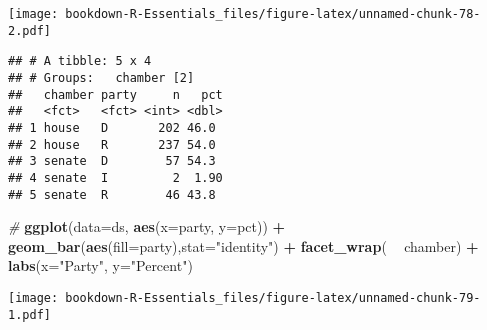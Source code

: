 \documentclass[]{book}
\newenvironment{Shaded}{\begin{snugshade}}{\end{snugshade}}
\newcommand{\KeywordTok}[1]{\textcolor[rgb]{0.13,0.29,0.53}{\textbf{#1}}}
\newcommand{\DataTypeTok}[1]{\textcolor[rgb]{0.13,0.29,0.53}{#1}}
\newcommand{\DecValTok}[1]{\textcolor[rgb]{0.00,0.00,0.81}{#1}}
\newcommand{\StringTok}[1]{\textcolor[rgb]{0.31,0.60,0.02}{#1}}
\newcommand{\CommentTok}[1]{\textcolor[rgb]{0.56,0.35,0.01}{\textit{#1}}}
\newcommand{\OperatorTok}[1]{\textcolor[rgb]{0.81,0.36,0.00}{\textbf{#1}}}
\newcommand{\NormalTok}[1]{#1}
\begin{document}
\texttt{[image: bookdown-R-Essentials\_files/figure-latex/unnamed-chunk-78-2.pdf]}

\begin{Shaded}
\end{Shaded}

\begin{verbatim}
## # A tibble: 5 x 4
## # Groups:   chamber [2]
##   chamber party     n   pct
##   <fct>   <fct> <int> <dbl>
## 1 house   D       202 46.0 
## 2 house   R       237 54.0 
## 3 senate  D        57 54.3 
## 4 senate  I         2  1.90
## 5 senate  R        46 43.8
\end{verbatim}

\begin{Shaded}
\begin{Highlighting}[]
\CommentTok{#}
\KeywordTok{ggplot}\NormalTok{(}\DataTypeTok{data=}\NormalTok{ds, }\KeywordTok{aes}\NormalTok{(}\DataTypeTok{x=}\NormalTok{party, }\DataTypeTok{y=}\NormalTok{pct)) }\OperatorTok{+}\StringTok{ }\KeywordTok{geom_bar}\NormalTok{(}\KeywordTok{aes}\NormalTok{(}\DataTypeTok{fill=}\NormalTok{party),}\DataTypeTok{stat=}\StringTok{"identity"}\NormalTok{) }\OperatorTok{+}
\StringTok{  }\KeywordTok{facet_wrap}\NormalTok{( }\OperatorTok{~}\StringTok{ }\NormalTok{chamber) }\OperatorTok{+}
\StringTok{  }\KeywordTok{labs}\NormalTok{(}\DataTypeTok{x=}\StringTok{"Party"}\NormalTok{, }\DataTypeTok{y=}\StringTok{"Percent"}\NormalTok{)}
\end{Highlighting}
\end{Shaded}

\texttt{[image: bookdown-R-Essentials\_files/figure-latex/unnamed-chunk-79-1.pdf]}
\end{document}
